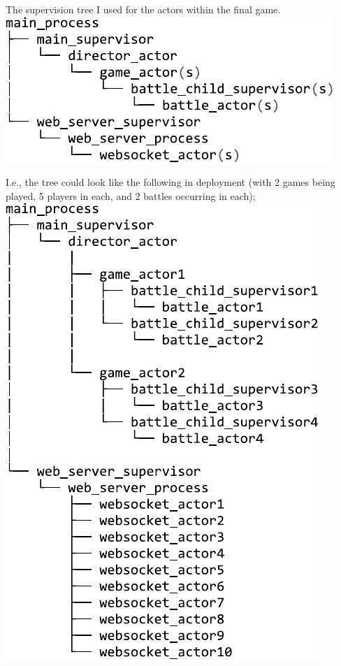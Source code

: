 \documentclass[]{final}
\begin{document}
\noindent
\begin{minipage}[t]{18em}
  The supervision tree I used for the actors within the final game.
  \includegraphics[width=\linewidth]{supervision_tree.pdf}
\end{minipage}
\hfill
\begin{minipage}[t]{20em}
  I.e., the tree could look like the following in deployment (with 2 games being
  played, 5 players in each, and 2 battles occurring in each);
  \includegraphics[width=\linewidth]{supervision_tree_deployment_eg.pdf}
\end{minipage}
\end{document}
